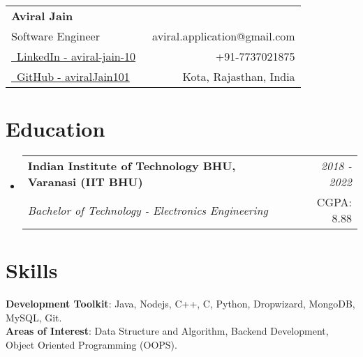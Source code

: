 \documentclass[a4paper,12pt]{article}
\makeatletter
\newcommand{\resumeSubheading}[4]{
\vspace{0.5mm}\item[]
    \begin{tabular*}{0.98\textwidth}[t]{l@{\extracolsep{\fill}}r}
        \textbf{#1} & \textit{\footnotesize{#4}} \\
        \textit{\footnotesize{#3}} &  \footnotesize{#2}\\
    \end{tabular*}
    \vspace{-1.0mm}
}
\newcommand{\resumeSubHeadingListStart}{\begin{itemize}[leftmargin=*,labelsep=0mm]}
\newcommand{\resumeSubHeadingListEnd}{\end{itemize}\vspace{2mm}}
\newcommand{\name}{Aviral Jain} %
\newcommand{\phone}{7737021875} %
\newcommand{\emaila}{aviral.application@gmail.com} %
\makeatother
\begin{document}


\parbox{\dimexpr\linewidth-0.5cm\relax}{
\begin{tabularx}{\linewidth}{L r} \\
  \textbf{\Large \name}\\
  {Software Engineer} & \raisebox{0.0\height}{\footnotesize \faEnvelope}\ {\emaila} \\
  \href{https://www.linkedin.com/in/aviral-jain-10/}{\raisebox{0.0\height}{\footnotesize \faLinkedin}\ LinkedIn - aviral-jain-10} &  {\raisebox{0.0\height}{\footnotesize \faPhone}\ +91-\phone} \\
  \href{https://github.com/aviralJain101}{\raisebox{0.0\height}{\footnotesize \faGithub}\ {GitHub - aviralJain101}}& {\raisebox{0.0\height}{\footnotesize}\ Kota, Rajasthan, India}\\
\end{tabularx}
}

\section{\textbf{Education}}
  \resumeSubHeadingListStart
    \resumeSubheading
      {Indian Institute of Technology BHU, Varanasi (IIT BHU)}{CGPA: 8.88}
      {Bachelor of Technology - Electronics Engineering}{2018 - 2022}
  \resumeSubHeadingListEnd
\vspace{-5.5mm}
%


\section{\textbf{Skills}}
 \begin{itemize}[leftmargin=0.05in, label={}]
    \small{\item{
     \textbf{Development Toolkit}{: Java, Nodejs, C++, C, Python, Dropwizard, MongoDB, MySQL, Git.} \\
         \vspace{2pt}
     \textbf{Areas of Interest}{: Data Structure and Algorithm, Backend Development, Object Oriented Programming (OOPS).}
    }}
 \end{itemize}
 \vspace{-12pt}



\end{document}
